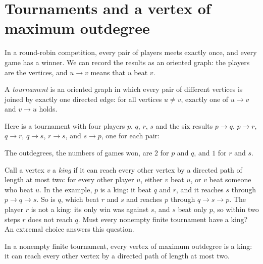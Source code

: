 \section{Tournaments and a vertex of maximum outdegree}\label{ch07:sec:tournament}
In a round-robin competition, every pair of players meets exactly once, and every game has a winner. We can record the results as an oriented graph: the players are the vertices, and $u\to v$ means that $u$ beat $v$.

\par\noindent\begin{minipage}{\linewidth}
\begin{definition}[Tournament]\label{ch07:def:tournament}
A \emph{tournament} is an oriented graph in which every pair of different vertices is joined by exactly one directed edge: for all vertices $u\ne v$, exactly one of $u\to v$ and $v\to u$ holds.
\end{definition}
\end{minipage}\par

Here is a tournament with four players $p$, $q$, $r$, $s$ and the six results $p\to q$, $p\to r$, $q\to r$, $q\to s$, $r\to s$, and $s\to p$, one for each pair:
\begin{center}
\end{center}
The outdegrees, the numbers of games won, are $2$ for $p$ and $q$, and $1$ for $r$ and $s$.

Call a vertex $v$ a \emph{king} if it can reach every other vertex by a directed path of length at most two: for every other player $u$, either $v$ beat $u$, or $v$ beat someone who beat $u$. In the example, $p$ is a king: it beat $q$ and $r$, and it reaches $s$ through $p\to q\to s$. So is $q$, which beat $r$ and $s$ and reaches $p$ through $q\to s\to p$. The player $r$ is not a king: its only win was against $s$, and $s$ beat only $p$, so within two steps $r$ does not reach $q$. Must every nonempty finite tournament have a king? An extremal choice answers this question.

\par\noindent\begin{minipage}{\linewidth}
\begin{proposition}\label{thm:king}
In a nonempty finite tournament, every vertex of maximum outdegree is a king: it can reach every other vertex by a directed path of length at most two.
\end{proposition}
\end{minipage}\par

